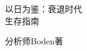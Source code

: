 \thispagestyle{empty}
\vspace*{3em}
\begin{center}
  {\xbsong{}以日为鉴：衰退时代\\生存指南\par}
  \vspace{4em}
  {\kaishu 分析师Boden\q 著\par}
\end{center}
\cleardoublepage

